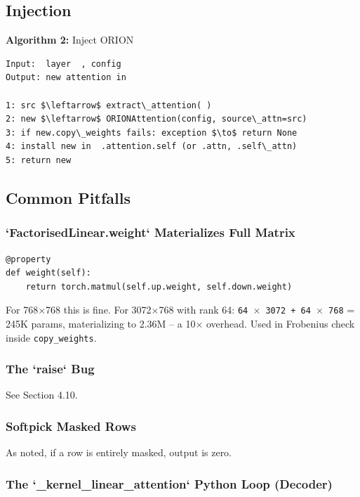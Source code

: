 \subsection{Injection}

\textbf{Algorithm 2:} Inject ORION
\begin{lstlisting}
Input:  layer  , config
Output: new attention in  

1: src $\leftarrow$ extract\_attention( )
2: new $\leftarrow$ ORIONAttention(config, source\_attn=src)
3: if new.copy\_weights fails: exception $\to$ return None
4: install new in  .attention.self (or .attn, .self\_attn)
5: return new
\end{lstlisting}

\subsection{Common Pitfalls}

\subsubsection{`FactorisedLinear.weight` Materializes Full Matrix}

\begin{lstlisting}
@property
def weight(self):
    return torch.matmul(self.up.weight, self.down.weight)
\end{lstlisting}

For 768$\times$768 this is fine. For 3072$\times$768 with rank 64: \texttt{64 $\times$ 3072 + 64 $\times$ 768} 
= 245K params, materializing to 2.36M -- a 10$\times$ overhead. Used in Frobenius 
check inside \texttt{copy\_weights}.

\subsubsection{The `raise` Bug}

See Section 4.10.

\subsubsection{Softpick Masked Rows}

As noted, if a row is entirely masked, output is zero.

\subsubsection{The `\_kernel\_linear\_attention` Python Loop (Decoder)}

